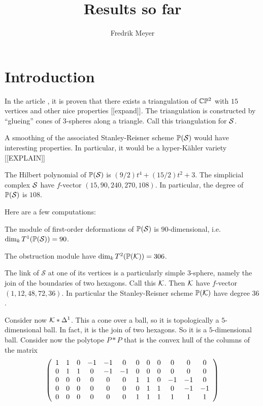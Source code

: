 \documentclass[11pt, english]{article}
\begin{document}
\title{Results so far}
\author{Fredrik Meyer}
\maketitle 

\section{Introduction}

In the article \cite{gaifullin_triangulation}, it is proven that there exists a triangulation of $\C \PP^2$ with $15$ vertices and other nice properties [[expand]]. The triangulation is constructed by ``glueing'' cones of $3$-spheres along a triangle.  Call this triangulation for $\S$.

A smoothing of the associated Stanley-Reisner scheme $\PP(\S)$ would have interesting properties. In particular, it would be a hyper-Kähler variety [[EXPLAIN]]

The Hilbert polynomial of $\PP(\S)$ is $(9/2) t^{4}+(15/2) t^{2}+3$. The simplicial complex $\S$ have $f$-vector $(15,90,240,270,108)$. In particular, the degree of $\PP(\S)$ is $108$.

Here are a few computations:
\begin{lemma}
The module of first-order deformations of $\PP(\S)$ is $90$-dimensional, i.e. $\dim_k T^1(\PP(\S)) = 90$.
\end{lemma}
\begin{lemma}
The obstruction module have $\dim_k T^2(\PP(\K))=306$.
\end{lemma}

The link of $\mathcal S$ at one of its vertices is a particularly simple $3$-sphere, namely the join of the boundaries of two hexagons. Call this $\K$. Then $\K$ have $f$-vector $(1, 12, 48, 72, 36)$. In particular the Stanley-Reisner scheme $\PP(\K)$ have degree $36$.

Consider now $\K \ast \Delta^1$. This a cone over a ball, so it is topologically a $5$-dimensional ball. In fact, it is the join of two hexagons. So it is a $5$-dimensional ball. Consider now the polytope $P \ast P$ that is the convex hull of the columns of the matrix
\[
\left(
\begin{array}{*{12}c}
 1 & 1 & 0 & -1 & -1& 0 & 0 & 0 & 0 & 0 & 0 & 0 \\
 0 & 1 & 1 & 0 & -1 & -1& 0 & 0 & 0  & 0 & 0 & 0 \\
 0 & 0 & 0 & 0 & 0 & 0 & 1 & 1 & 0  & -1 & -1 & 0 \\
 0 & 0 & 0 & 0 & 0 & 0 & 0 & 1 & 1  & 0 & -1 & -1 \\
 0 & 0 & 0 & 0 & 0 & 0 & 1 & 1 & 1  & 1 & 1 & 1 \\
\end{array}
\right) \]
\end{document}
